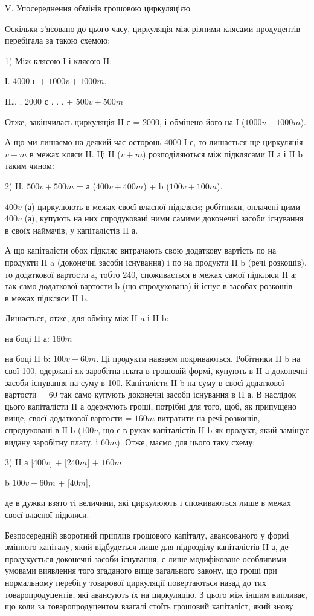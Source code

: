 V. Упосереднення обмінів грошовою циркуляцією

Оскільки з’ясовано до цього часу, циркуляція між різними клясами
продуцентів перебігала за такою схемою:

1) Між клясою І і клясою II:

І. 4000 с + $1000 v + 1000 m$.

II\dots{} .    2000 с . . . + $500 v + 500 m$

Отже, закінчилась циркуляція II с = 2000, і обмінено його на
І ($1000 v + 1000 m$).

А що ми лишаємо на деякий час осторонь 4000 І с, то лишається ще
циркуляція $v + m$ в межах кляси II. Ці II ($v + m$) розподіляються між
підклясами II а і II b таким чином:

2) II. $500 v + 500 m$ = а ($400 v + 400 m$) + b ($100 v + 100 m$).

$400 v$ (а) циркулюють в межах своєї власної підкляси; робітники,
оплачені цими $400 v$ (а), купують на них спродуковані ними самими доконечні
засоби існування в своїх наймачів, у капіталістів II а.

А що капіталісти обох підкляс витрачають свою додаткову вартість
по  на продукти II a (доконечні засоби існування) і по  на продукти
II b (речі розкошів), то  додаткової вартости а, тобто 240, споживається
в межах самої підкляси II а; так само  додаткової вартости b (що спродукована)
й існує в засобах розкошів — в межах підкляси II b.

Лишається, отже, для обміну між II a і II b:

на боці II а: $160 m$

на боці II b: $100 v + 60 m$. Ці продукти навзаєм покриваються. Робітники
II b на свої 100, одержані як заробітна плата в грошовій формі,
купують в II а доконечні засоби існування на суму в 100. Капіталісти
II b на суму в  своєї додаткової вартости = 60 так само купують
доконечні засоби існування в II а. В наслідок цього капіталісти II а одержують
гроші, потрібні для того, щоб, як припущено вище,  своєї
додаткової вартости = $160 m$ витратити на речі розкошів, спродуковані
в ІІ b ($100 v$, що є в руках капіталістів II b як продукт, який заміщує
видану заробітну плату, і $60 m$). Отже, маємо для цього таку схему:

3) II а [$400 v$] + [$240 m$] + $160 m$

b \dotfill $100 v + 60 m$ + [$40 m$],

де в дужки взято ті величини, які циркулюють і споживаються лише в
межах своєї власної підкляси.

Безпосередній зворотний приплив грошового капіталу, авансованого у
формі змінного капіталу, який відбудеться лише для підрозділу капіталістів
II а, де продукується доконечні засоби існування, є лише модифіковане
особливими умовами виявлення того згаданого вище
загального закону, що гроші при нормальному перебігу товарової
циркуляції повертаються назад до тих товаропродуцентів, які авансують
їх на циркуляцію. З цього між іншим випливає, що коли за
товаропродуцентом взагалі стоїть грошовий капіталіст, який знову
\parbreak{}  %
